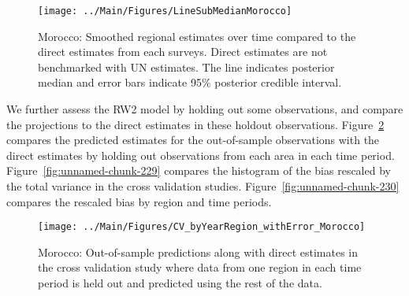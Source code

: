 \documentclass[12pt]{article}\usepackage[]{graphicx}\usepackage[]{color}
\newenvironment{knitrout}{}{} %
\begin{document}
\begin{knitrout}
\color{fgcolor}\begin{figure}[bht]

{\centering \texttt{[image: ../Main/Figures/LineSubMedianMorocco]} 

}

\caption[Morocco]{Morocco: Smoothed regional estimates over time compared to the direct estimates from each surveys. Direct estimates are not benchmarked with UN estimates. The line indicates posterior median and error bars indicate 95\% posterior credible interval.}\label{fig:unnamed-chunk-227}
\end{figure}


\end{knitrout}
We further assess the RW2 model by holding out some observations, and compare the projections to the direct estimates in these holdout observations. Figure~\ref{fig:unnamed-chunk-228} compares the predicted estimates for the out-of-sample observations  with the direct estimates by holding out observations from each area in each time period.  Figure~\ref{fig:unnamed-chunk-229} compares the histogram of the bias rescaled by the total variance in the cross validation studies. Figure~\ref{fig:unnamed-chunk-230} compares the rescaled bias by region and time periods.



 
\begin{knitrout}
\color{fgcolor}\begin{figure}[bht]

{\centering \texttt{[image: ../Main/Figures/CV\_byYearRegion\_withError\_Morocco]} 

}

\caption[Morocco]{Morocco: Out-of-sample predictions along with direct estimates in the cross validation study where data from one region in each time period is held out and predicted using the rest of the data.}\label{fig:unnamed-chunk-228}
\end{figure}


\end{knitrout}
\end{document}

